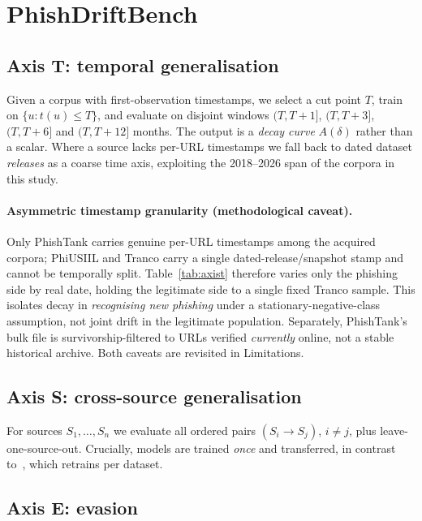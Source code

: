 \documentclass[conference]{IEEEtran}
\begin{document}
\section{PhishDriftBench}

\subsection{Axis T: temporal generalisation}
\label{sec:axist-caveat}

Given a corpus with first-observation timestamps, we select a cut point $T$,
train on $\{u : t(u) \le T\}$, and evaluate on disjoint windows
$(T, T{+}1]$, $(T, T{+}3]$, $(T, T{+}6]$ and $(T, T{+}12]$ months. The output
is a \emph{decay curve} $A(\delta)$ rather than a scalar. Where a source lacks
per-URL timestamps we fall back to dated dataset \emph{releases} as a coarse
time axis, exploiting the 2018--2026 span of the corpora in this study.

\paragraph{Asymmetric timestamp granularity (methodological caveat).} Only
PhishTank carries genuine per-URL timestamps among the acquired corpora;
PhiUSIIL and Tranco carry a single dated-release/snapshot stamp and
cannot be temporally split. Table~\ref{tab:axist} therefore varies only
the phishing side by real date, holding the legitimate side to a single fixed Tranco sample. This isolates
decay in \emph{recognising new phishing} under a stationary-negative-class
assumption, not joint drift in the legitimate population. Separately, PhishTank's bulk file is
survivorship-filtered to URLs verified \emph{currently} online, not a
stable historical archive. Both caveats are revisited in Limitations.

\subsection{Axis S: cross-source generalisation}

For sources $S_1, \dots, S_n$ we evaluate all ordered pairs
$(S_i \rightarrow S_j)$, $i \neq j$, plus leave-one-source-out. Crucially,
models are trained \emph{once} and transferred, in contrast
to~\cite{goenka2025layered}, which retrains per dataset.

\subsection{Axis E: evasion}
\end{document}
